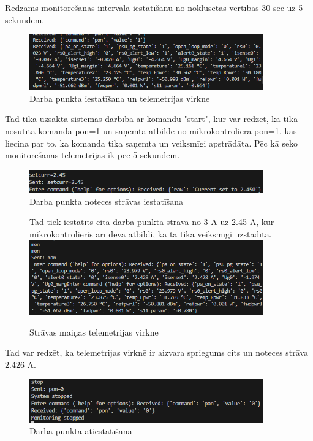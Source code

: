 Redzams monitorēšanas intervāla iestatīšanu no noklusētās vērtības 30 sec uz 5 sekundēm.
\begin{figure}[H]
	\centering
    \includegraphics[width=0.9\textwidth]{pictures/script_system_start .png}\hspace{1cm}
    \caption{Darba punkta iestatīšana un telemetrijas virkne}
\end{figure}
Tad tika uzsākta sistēmas darbība ar komandu "start", kur var redzēt, ka tika nosūtīta komanda pon=1 un saņemta atbilde no mikrokontroliera pon=1, kas liecina par to, ka komanda tika saņemta un veiksmīgi apstrādāta. Pēc kā seko monitorēšanas telemetrijas ik pēc 5 sekundēm.
\begin{figure}[H]
	\centering
    \includegraphics[width=0.9\textwidth]{pictures/script_setcurr.png}\hspace{1cm}
    \caption{Darba punkta noteces strāvas iestatīšana}
\end{figure}
\begin{figure}[H]
Tad tiek iestatīts cita darba punkta strāva no 3 A uz 2.45 A, kur mikrokontrolieris arī deva atbildi, ka tā tika veiksmīgi uzstādīta.
	\centering
    \includegraphics[width=0.9\textwidth]{pictures/script_setcurr_tel.png}\hspace{1cm}
    \caption{Strāvas maiņas telemetrijas virkne}
\end{figure}
Tad var redzēt, ka telemetrijas virknē ir aizvara spriegums cits un noteces strāva 2.426 A.
\begin{figure}[H]
	\centering
    \includegraphics[width=0.9\textwidth]{pictures/script_system_stop.png}\hspace{1cm}
    \caption{Darba punkta atiestatīšana}
\end{figure}
